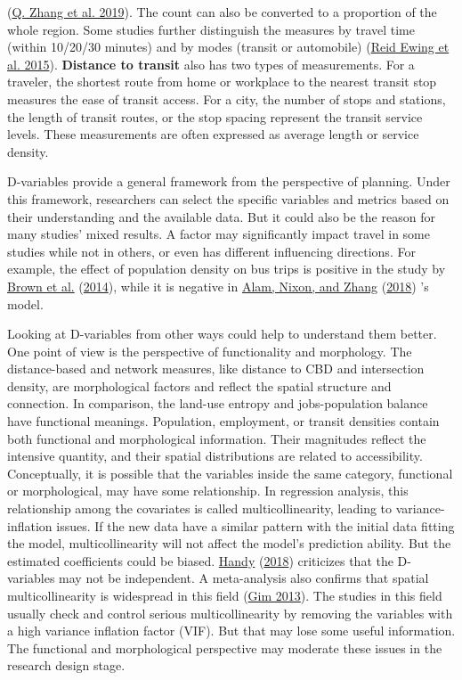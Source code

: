 \documentclass[
  12pt,
]{article}
\begin{document}
(\protect\hyperlink{ref-zhangHouseholdTripGeneration2019}{Q. Zhang et al. 2019}). The count can also be converted to a proportion of the whole region. Some studies further distinguish the measures by travel time (within 10/20/30 minutes) and by modes (transit or automobile) (\protect\hyperlink{ref-ewingVaryingInfluencesBuilt2015}{Reid Ewing et al. 2015}). \textbf{Distance to transit} also has two types of measurements. For a traveler, the shortest route from home or workplace to the nearest transit stop measures the ease of transit access. For a city, the number of stops and stations, the length of transit routes, or the stop spacing represent the transit service levels. These measurements are often expressed as average length or service density.

D-variables provide a general framework from the perspective of planning. Under this framework, researchers can select the specific variables and metrics based on their understanding and the available data. But it could also be the reason for many studies' mixed results. A factor may significantly impact travel in some studies while not in others, or even has different influencing directions. For example, the effect of population density on bus trips is positive in the study by \protect\hyperlink{ref-brownUnderstandingTransitRidership2014}{Brown et al.} (\protect\hyperlink{ref-brownUnderstandingTransitRidership2014}{2014}), while it is negative in \protect\hyperlink{ref-alamFactorsAffectingTravel2018}{Alam, Nixon, and Zhang} (\protect\hyperlink{ref-alamFactorsAffectingTravel2018}{2018}) 's model.

Looking at D-variables from other ways could help to understand them better. One point of view is the perspective of functionality and morphology. The distance-based and network measures, like distance to CBD and intersection density, are morphological factors and reflect the spatial structure and connection. In comparison, the land-use entropy and jobs-population balance have functional meanings. Population, employment, or transit densities contain both functional and morphological information. Their magnitudes reflect the intensive quantity, and their spatial distributions are related to accessibility. Conceptually, it is possible that the variables inside the same category, functional or morphological, may have some relationship. In regression analysis, this relationship among the covariates is called multicollinearity, leading to variance-inflation issues. If the new data have a similar pattern with the initial data fitting the model, multicollinearity will not affect the model's prediction ability. But the estimated coefficients could be biased. \protect\hyperlink{ref-handyEnoughAlreadyLet2018}{Handy} (\protect\hyperlink{ref-handyEnoughAlreadyLet2018}{2018}) criticizes that the D-variables may not be independent. A meta-analysis also confirms that spatial multicollinearity is widespread in this field (\protect\hyperlink{ref-gimRelationshipsLandUse2013}{Gim 2013}). The studies in this field usually check and control serious multicollinearity by removing the variables with a high variance inflation factor (VIF). But that may lose some useful information. The functional and morphological perspective may moderate these issues in the research design stage.
\end{document}
